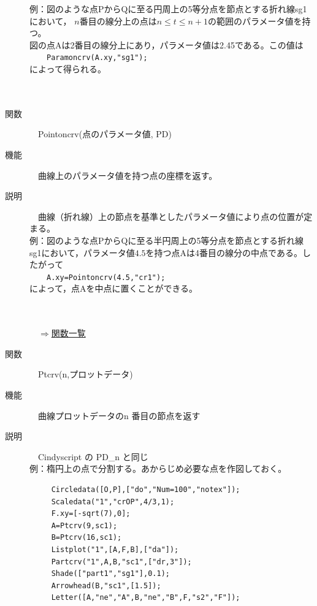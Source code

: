 \documentclass[papersize,a4paper,12pt,uplatex]{jsarticle}
\begin{document}
\begin{description}
例：図のような点PからQに至る円周上の5等分点を節点とする折れ線sg1において，
$n$番目の線分上の点は$n\leq t\leq n+1$の範囲のパラメータ値を持つ。\\
図の点$\mathrm{A}$は2番目の線分上にあり，パラメータ値は2.45である。この値は\\
　　\verb|Paramoncrv(A.xy,"sg1");|\\
によって得られる。\\
　\\
　　　　　　　\\

\hypertarget{pointcrv}{}
\item[関数]　Pointoncrv(点のパラメータ値, PD)
\item[機能]　曲線上のパラメータ値を持つ点の座標を返す。
\item[説明]　曲線（折れ線）上の節点を基準としたパラメータ値により点の位置が定まる。\\

例：図のような点$\mathrm{P}$から$\mathrm{Q}$に至る半円周上の5等分点を節点とする折れ線sg1において，パラメータ値$4.5$を持つ点$\mathrm{A}$は4番目の線分の中点である。したがって\\
　　\verb|A.xy=Pointoncrv(4.5,"cr1");|\\
によって，点Aを中点に置くことができる。\\
　\\
　　　　　　　　

\begin{flushright}　\hyperlink{functionlist}{$\Rightarrow$関数一覧}\end{flushright}
\newpage
\hypertarget{ptcrv}{}
\item[関数]　Ptcrv(n,プロットデータ)
\item[機能]　曲線プロットデータのn 番目の節点を返す
\item[説明]　Cindyscript の PD\_n と同じ\\

例：楕円上の点で分割する。あからじめ必要な点を作図しておく。
\begin{verbatim}
　　　Circledata([O,P],["do","Num=100","notex"]);
　　　Scaledata("1","crOP",4/3,1);
　　　F.xy=[-sqrt(7),0];
　　　A=Ptcrv(9,sc1);
　　　B=Ptcrv(16,sc1);
　　　Listplot("1",[A,F,B],["da"]);
　　　Partcrv("1",A,B,"sc1",["dr,3"]);
　　　Shade(["part1","sg1"],0.1);
　　　Arrowhead(B,"sc1",[1.5]);
　　　Letter([A,"ne","A",B,"ne","B",F,"s2","F"]);
\end{verbatim}
   　　　    　　　
   

\end{description}
\end{document}
